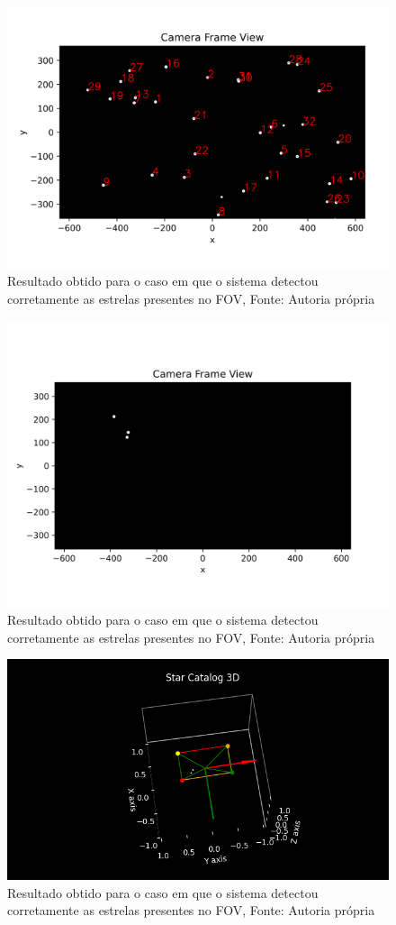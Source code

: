 \begin{figure}[H]
    \centering
    \includegraphics[width=1\textwidth]{images/acertou.png}
    \caption{Resultado obtido para o caso em que o sistema detectou corretamente as estrelas presentes no FOV, Fonte: Autoria própria}
    \label{fig:acertou}
\end{figure}

\begin{figure}[H]
    \centering
    \includegraphics[width=1\textwidth]{images/acertou_2D.png}
    \caption{Resultado obtido para o caso em que o sistema detectou corretamente as estrelas presentes no FOV, Fonte: Autoria própria}
    \label{fig:acertou_2D}
\end{figure}

\begin{figure}[H]
    \centering
    \includegraphics[width=1\textwidth]{images/acertou_3D.png}
    \caption{Resultado obtido para o caso em que o sistema detectou corretamente as estrelas presentes no FOV, Fonte: Autoria própria}
    \label{fig:acertou_3D}
\end{figure}
